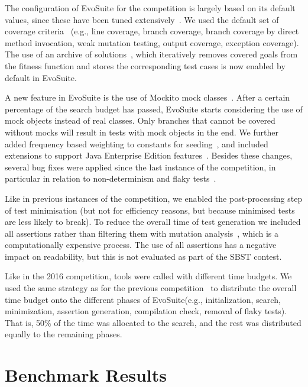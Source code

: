 \documentclass[10pt,conference]{IEEEtran}
\newcommand{\EVOSUITE}{{\sc EvoSuite}\xspace}
\begin{document}
The configuration of \EVOSUITE for the competition is largely based on
its default values, since these have been tuned
extensively~\cite{arcuri2013parameter}. We used the default set of
coverage criteria~\cite{rojas2015combining} (e.g., line coverage,
branch coverage, branch coverage by direct method invocation, weak
mutation testing, output coverage, exception coverage). The use of an
archive of solutions~\cite{emse_archive}, which iteratively removes
covered goals from the fitness function and stores the corresponding
test cases is now enabled by default in \EVOSUITE.

A new feature in \EVOSUITE is the use of Mockito mock
classes~\cite{ICST_Mocking17}. After a certain percentage of the
search budget has passed, \EVOSUITE starts considering the use of mock
objects instead of real classes. Only branches that cannot be covered
without mocks will result in tests with mock objects in the end. We
further added frequency based weighting to constants for
seeding~\cite{sakti2015instance}, and included extensions to support
Java Enterprise Edition features~\cite{arcuri2016java}. Besides these
changes, several bug fixes were applied since the last instance of the
competition, in particular in relation to non-determinism and flaky
tests~\cite{arcuri2014automated}.

Like in previous instances of the competition, we enabled the
post-processing step of test minimisation (but not for efficiency
reasons, but because minimised tests are less likely to break). To
reduce the overall time of test generation we included all assertions
rather than filtering them with mutation
analysis~\cite{10.1109/TSE.2011.93}, which is a computationally
expensive process. The use of all assertions has a negative impact on
readability, but this is not evaluated as part of the SBST contest.

Like in the 2016 competition, tools were called with different time
budgets. We used the same strategy as for the previous
competition~\cite{evosuiteAtSbst2016} to distribute the overall time
budget onto the different phases of \EVOSUITE (e.g., initialization,
search, minimization, assertion generation, compilation check, removal
of flaky tests). That is, 50\% of the time was allocated to the
search, and the rest was distributed equally to the remaining
phases.


\section{Benchmark Results}
\end{document}
